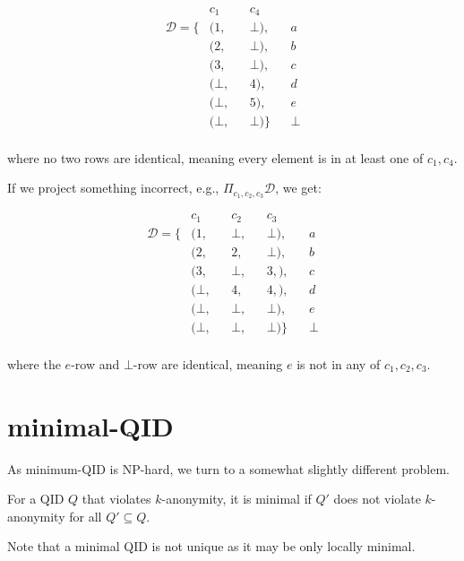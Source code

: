 \documentclass[12pt]{llncs}
\newcommand{\Proj}[1]{\Pi_{#1}}
\begin{document}
\begin{align*}
                 &  c_1   && c_4     &&\\
\mathcal{D} = \{ & (1,    && \bot),  && a\\
                 & (2,    && \bot),  && b\\
                 & (3,    && \bot),  && c\\
                 & (\bot, && 4   ),  && d\\
                 & (\bot, && 5   ),  && e\\
                 & (\bot, && \bot)\} && \bot\\
\end{align*}

where no two rows are identical, meaning every element is in at least one of $c_1,c_4$.

If we project something incorrect, e.g., $\Proj{c_1,c_2,c_3} \mathcal{D}$, we get:

\begin{align*}
                 &  c_1   && c_2   && c_3     &&\\
\mathcal{D} = \{ & (1,    && \bot, && \bot),  && a\\
                 & (2,    && 2,    && \bot),  && b\\
                 & (3,    && \bot, && 3,  ),  && c\\
                 & (\bot, && 4,    && 4,  ),  && d\\
                 & (\bot, && \bot, && \bot),  && e\\
                 & (\bot, && \bot, && \bot)\} && \bot\\
\end{align*}

where the $e$-row and $\bot$-row are identical, meaning $e$ is not in any of $c_1,c_2,c_3$.

\section{minimal-QID}
As minimum-QID is NP-hard, we turn to a somewhat slightly different problem.

\begin{definition}
For a QID $Q$ that violates $k$-anonymity, it is minimal if $Q'$ does not violate $k$-anonymity for all $Q' \subseteq Q$.
\end{definition}

Note that a minimal QID is not unique as it may be only locally minimal.
\end{document}
